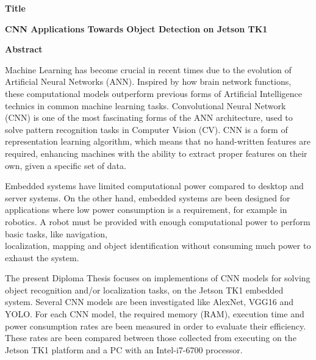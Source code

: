 {\selectfont

{}


\begin{center}
  \centering
  \textbf{\Large{Title}}
  \vspace{0.5cm}

  \textbf{\large{CNN Applications Towards Object Detection on Jetson TK1}}

  \vspace{1cm}

  \centering
  \textbf{Abstract}
\end{center}

Machine Learning has become crucial in recent times due to the evolution of
Artificial Neural Networks (ANN). Inspired by how brain network functions,
these computational models outperform previous forms of Artificial Intelligence
technics in common machine learning tasks.
Convolutional Neural Network (CNN) is one of the most fascinating forms of the ANN architecture,
used to solve pattern recognition tasks in Computer Vision (CV).
CNN is a form of representation learning algorithm, which means that no
hand-written features are required, enhancing machines with the ability
to extract proper features on their own, given a specific set of data.

Embedded systems have limited computational power compared to
desktop and server systems. On the other hand, embedded systems are been
designed for applications where low power consumption is a requirement,
for example in robotics. A robot must be provided with enough computational
power to perform basic tasks, like navigation, \\ localization, mapping
and object identification without consuming much power to exhaust the system.

The present Diploma Thesis focuses on implementions of CNN models for solving
object recognition and/or localization tasks, on the Jetson TK1 embedded system.
Several CNN models are been investigated like AlexNet, VGG16 and YOLO.
For each CNN model, the required memory (RAM), execution time and power consumption
rates are been measured in order to evaluate their efficiency. These rates are
been compared between those collected from executing on the Jetson TK1 platform
and a PC with an Intel-i7-6700 processor.

}
